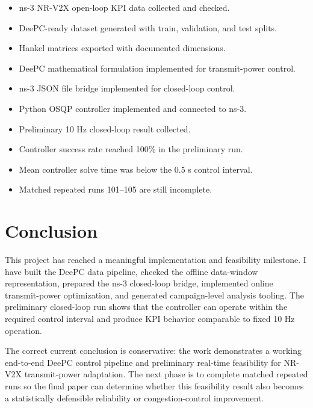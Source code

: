 \documentclass[11pt]{article}
\newcommand{\deePC}{DeePC}
\begin{document}
\begin{itemize}
    \item ns-3 NR-V2X open-loop KPI data collected and checked.
    \item \deePC-ready dataset generated with train, validation, and test splits.
    \item Hankel matrices exported with documented dimensions.
    \item \deePC{} mathematical formulation implemented for transmit-power control.
    \item ns-3 JSON file bridge implemented for closed-loop control.
    \item Python OSQP controller implemented and connected to ns-3.
    \item Preliminary 10 Hz closed-loop result collected.
    \item Controller success rate reached 100\% in the preliminary run.
    \item Mean controller solve time was below the 0.5 s control interval.
    \item Matched repeated runs 101--105 are still incomplete.
\end{itemize}

\section{Conclusion}

This project has reached a meaningful implementation and feasibility milestone.
I have built the \deePC{} data pipeline, checked the offline data-window representation,
prepared the ns-3 closed-loop bridge, implemented online transmit-power
optimization, and generated campaign-level analysis tooling. The preliminary
closed-loop run shows that the controller can operate within the required
control interval and produce KPI behavior comparable to fixed 10 Hz operation.

The correct current conclusion is conservative: the work demonstrates a
working end-to-end \deePC{} control pipeline and preliminary real-time
feasibility for NR-V2X transmit-power adaptation. The next phase is to complete
matched repeated runs so the final paper can determine whether this feasibility
result also becomes a statistically defensible reliability or congestion-control
improvement.
\end{document}
